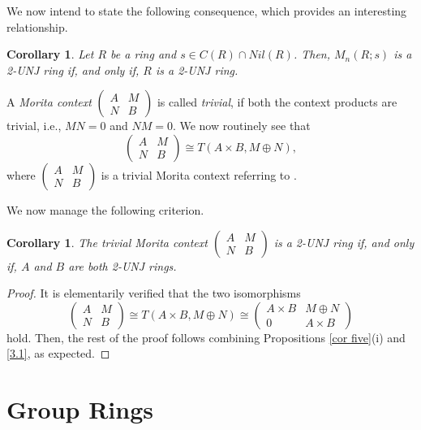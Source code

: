 \documentclass[12pt]{amsart}
\newtheorem{corollary}[theorem]{Corollary}
\theoremstyle{definition}
\begin{document}
\medskip

We now intend to state the following consequence, which provides an interesting relationship.

\begin{corollary}\label{4.10}
Let $R$ be a ring and $s\in C(R)\cap Nil(R)$. Then, $M_{n}(R;s)$ is a 2-UNJ ring if, and only if, $R$ is a 2-UNJ ring.
\end{corollary}

A {\it Morita context} $\begin{pmatrix}
	A & M\\
	N & B
\end{pmatrix}$ is called {\it trivial}, if both the context products are trivial, i.e., $MN=0$ and $NM=0$. We now routinely see that
$$\begin{pmatrix}
	A & M\\
	N & B
\end{pmatrix}\cong T(A\times B, M\oplus N),$$
where
$\begin{pmatrix}
	A & M\\
	N & B
\end{pmatrix}$ is a trivial Morita context referring to \cite{20}.

\medskip

We now manage the following criterion.

\begin{corollary}\label{4.11}
The trivial Morita context
$\begin{pmatrix}
		A & M\\
		N & B
\end{pmatrix}$ is a 2-UNJ ring if, and only if, $A$ and $B$ are both 2-UNJ rings.
\end{corollary}

\begin{proof}
It is elementarily verified that the two isomorphisms
$$\begin{pmatrix}
		A & M\\
		N & B
\end{pmatrix} \cong T(A\times B,M\oplus N) \cong \begin{pmatrix}
		A\times B & M\oplus N\\
		0 & A \times B
\end{pmatrix}$$ hold. Then, the rest of the proof follows combining Propositions \ref{cor five}(i) and \ref{3.1}, as expected.
\end{proof}

\section{Group Rings}
\end{document}

